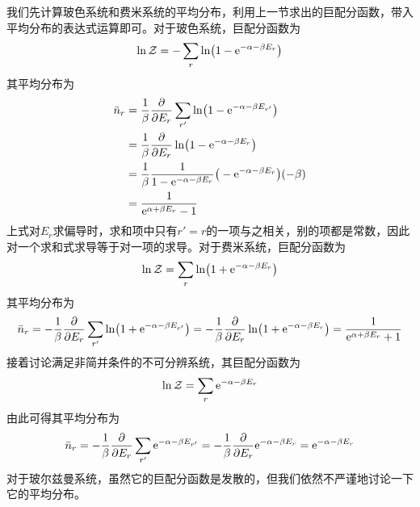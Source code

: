 \documentclass[../../main.tex]{subfiles}
\begin{document}
我们先计算玻色系统和费米系统的平均分布，利用上一节求出的巨配分函数，带入平均分布的表达式运算即可。对于玻色系统，巨配分函数为
\begin{equation}
    \ln\mathcal{Z}=-\sum_r \ln(1-\mathrm{e}^{-\alpha-\beta E_r})
\end{equation}
其平均分布为
\begin{equation}
    \begin{split}
        \bar{n}_r&=\frac{1}{\beta}\pdv{E_r}\sum_{r'}\ln(1-\mathrm{e}^{-\alpha-\beta E_{r'}}) \\
        &=\frac{1}{\beta}\pdv{E_r}\ln(1-\mathrm{e}^{-\alpha-\beta E_{r}}) \\
        &=\frac{1}{\beta}\frac{1}{1-\mathrm{e}^{-\alpha-\beta E_{r}}}\big(-\mathrm{e}^{-\alpha-\beta E_{r}}\big)(-\beta) \\
        &=\frac{1}{\mathrm{e}^{\alpha+\beta E_{r}}-1}
    \end{split}
\end{equation}
上式对\(E_r\)求偏导时，求和项中只有\(r'=r\)的一项与之相关，别的项都是常数，因此对一个求和式求导等于对一项的求导。对于费米系统，巨配分函数为
\begin{equation}
    \ln\mathcal{Z}=\sum_r\ln(1+\mathrm{e}^{-\alpha-\beta E_{r}})
\end{equation}
其平均分布为
\begin{equation}
        \bar{n}_r=-\frac{1}{\beta}\pdv{E_r}\sum_{r'}\ln(1+\mathrm{e}^{-\alpha-\beta E_{r'}})=-\frac{1}{\beta}\pdv{E_r}\ln(1+\mathrm{e}^{-\alpha-\beta E_{r}})=\frac{1}{\mathrm{e}^{\alpha+\beta E_{r}}+1}
\end{equation}
接着讨论满足非简并条件的不可分辨系统，其巨配分函数为
\begin{equation}
    \ln\mathcal{Z}=\sum_r \mathrm{e}^{-\alpha-\beta E_{r}}
\end{equation}
由此可得其平均分布为
\begin{equation}
        \bar{n}_r=-\frac{1}{\beta}\pdv{E_r}\sum_{r'}\mathrm{e}^{-\alpha-\beta E_{r'}}=-\frac{1}{\beta}\pdv{E_r}\mathrm{e}^{-\alpha-\beta E_{r}}=\mathrm{e}^{-\alpha-\beta E_{r}}
\end{equation}
对于玻尔兹曼系统，虽然它的巨配分函数是发散的，但我们依然不严谨地讨论一下它的平均分布。
\end{document}
